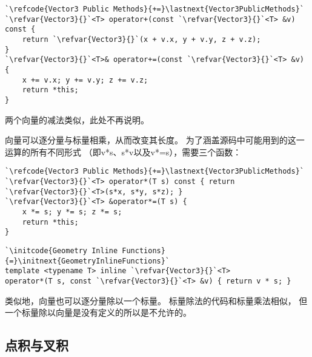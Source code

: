 \begin{lstlisting}
`\refcode{Vector3 Public Methods}{+=}\lastnext{Vector3PublicMethods}`
`\refvar{Vector3}{}`<T> operator+(const `\refvar{Vector3}{}`<T> &v) const {
    return `\refvar{Vector3}{}`(x + v.x, y + v.y, z + v.z);
}
`\refvar{Vector3}{}`<T>& operator+=(const `\refvar{Vector3}{}`<T> &v) {
    x += v.x; y += v.y; z += v.z;
    return *this;
}
\end{lstlisting}

两个向量的减法类似，此处不再说明。

向量可以逐分量与标量相乘，从而改变其长度。
为了涵盖源码中可能用到的这一运算的所有不同形式
（即{\ttfamily v*s}、{\ttfamily s*v}以及{\ttfamily v*=s}），需要三个函数：
\begin{lstlisting}
`\refcode{Vector3 Public Methods}{+=}\lastnext{Vector3PublicMethods}`
`\refvar{Vector3}{}`<T> operator*(T s) const { return `\refvar{Vector3}{}`<T>(s*x, s*y, s*z); }
`\refvar{Vector3}{}`<T> &operator*=(T s) {
    x *= s; y *= s; z *= s;
    return *this;
}
\end{lstlisting}
\begin{lstlisting}
`\initcode{Geometry Inline Functions}{=}\initnext{GeometryInlineFunctions}`
template <typename T> inline `\refvar{Vector3}{}`<T>
operator*(T s, const `\refvar{Vector3}{}`<T> &v) { return v * s; }
\end{lstlisting}

类似地，向量也可以逐分量除以一个标量。
标量除法的代码和标量乘法相似，
但一个标量除以向量是没有定义的所以是不允许的。
\subsection{点积与叉积}\label{sub:点积与叉积}